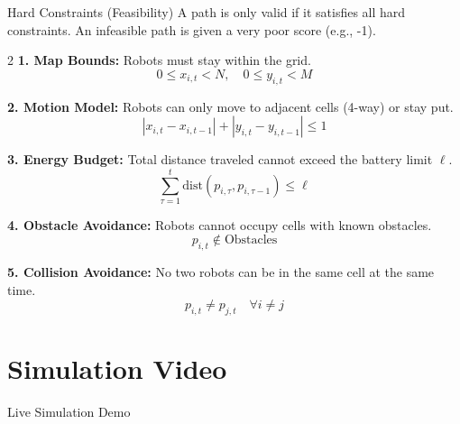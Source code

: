 \documentclass{beamer}
\begin{document}
\begin{frame}{Hard Constraints (Feasibility)}
A path is only valid if it satisfies all hard constraints. An infeasible path is given a very poor score (e.g., -1).

\begin{multicols}{2}
    \textbf{1. Map Bounds:}
    Robots must stay within the grid.
    \[ 0 \le x_{i,t} < N, \quad 0 \le y_{i,t} < M \]
    
    \textbf{2. Motion Model:}
    Robots can only move to adjacent cells (4-way) or stay put.
    \[ |x_{i,t}-x_{i,t-1}| + |y_{i,t}-y_{i,t-1}| \le 1 \]
    
    \textbf{3. Energy Budget:}
    Total distance traveled cannot exceed the battery limit $\ell$.
    \[ \sum_{\tau=1}^{t} \text{dist}(p_{i,\tau}, p_{i,\tau-1}) \le \ell \]
    
    \columnbreak
    
    \textbf{4. Obstacle Avoidance:}
    Robots cannot occupy cells with known obstacles.
    \[ p_{i,t} \notin \text{Obstacles} \]
    
    \textbf{5. Collision Avoidance:}
    No two robots can be in the same cell at the same time.
    \[ p_{i,t} \neq p_{j,t} \quad \forall i \neq j \]
\end{multicols}
\end{frame}



\section{Simulation Video}

\begin{frame}{Live Simulation Demo}

\end{frame}
\end{document}
